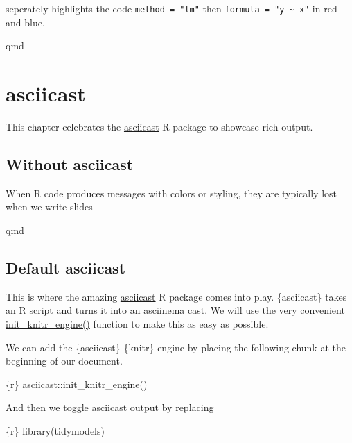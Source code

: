 \documentclass[
  letterpaper,
  DIV=11,
  numbers=noendperiod]{scrreprt}
\newenvironment{Shaded}{\begin{snugshade}}{\end{snugshade}}
\newcommand{\InformationTok}[1]{\textcolor[rgb]{0.37,0.37,0.37}{#1}}
\begin{document}
seperately highlights the code \texttt{method\ =\ "lm"} then
\texttt{formula\ =\ "y\ \textasciitilde{}\ x"} in red and blue.

qmd

\chapter{asciicast}\label{asciicast}

This chapter celebrates the
\href{https://github.com/r-lib/asciicast}{asciicast} R package to
showcase rich output.

\section{Without asciicast}\label{without-asciicast}

When R code produces messages with colors or styling, they are typically
lost when we write slides

qmd

\section{Default asciicast}\label{default-asciicast}

This is where the amazing
\href{https://github.com/r-lib/asciicast}{asciicast} R package comes
into play. \{asciicast\} takes an R script and turns it into an
\href{https://asciinema.org/}{asciinema} cast. We will use the very
convenient
\href{https://asciicast.r-lib.org/reference/init_knitr_engine.html}{init\_knitr\_engine()}
function to make this as easy as possible.

We can add the \{asciicast\} \{knitr\} engine by placing the following
chunk at the beginning of our document.

\begin{Shaded}
\begin{Highlighting}[]
\InformationTok{\textasciigrave{}\textasciigrave{}\textasciigrave{}\{r\}}
\InformationTok{asciicast::init\_knitr\_engine()}
\InformationTok{\textasciigrave{}\textasciigrave{}\textasciigrave{}}
\end{Highlighting}
\end{Shaded}

And then we toggle asciicast output by replacing

\begin{Shaded}
\begin{Highlighting}[]
\InformationTok{\textasciigrave{}\textasciigrave{}\textasciigrave{}\{r\}}
\InformationTok{library(tidymodels)}
\InformationTok{\textasciigrave{}\textasciigrave{}\textasciigrave{}}
\end{Highlighting}
\end{Shaded}
\end{document}

